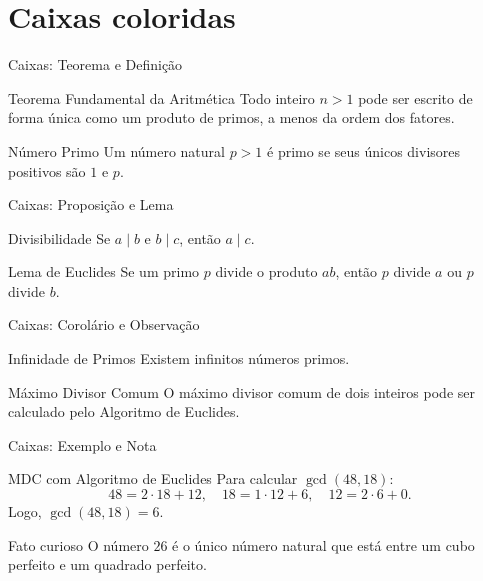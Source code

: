 \section{Caixas coloridas}

\begin{frame}{Caixas: Teorema e Definição}
	\begin{CaixaTeo}{Teorema Fundamental da Aritmética}
		Todo inteiro $n > 1$ pode ser escrito de forma única como um produto de primos, a menos da ordem dos fatores.
	\end{CaixaTeo}
	
	\begin{CaixaDef}{Número Primo}
		Um número natural $p > 1$ é primo se seus únicos divisores positivos são $1$ e $p$.
	\end{CaixaDef}
\end{frame}

\begin{frame}{Caixas: Proposição e Lema}
	\begin{CaixaProp}{Divisibilidade}
		Se $a \mid b$ e $b \mid c$, então $a \mid c$.
	\end{CaixaProp}
	
	\begin{CaixaLema}{Lema de Euclides}
		Se um primo $p$ divide o produto $ab$, então $p$ divide $a$ ou $p$ divide $b$.
	\end{CaixaLema}
\end{frame}

\begin{frame}{Caixas: Corolário e Observação}
	\begin{CaixaCoro}{Infinidade de Primos}
		Existem infinitos números primos.
	\end{CaixaCoro}
	
	\begin{CaixaObs}{Máximo Divisor Comum}
		O máximo divisor comum de dois inteiros pode ser calculado pelo Algoritmo de Euclides.
	\end{CaixaObs}
\end{frame}

\begin{frame}{Caixas: Exemplo e Nota}
	\begin{CaixaExem}{MDC com Algoritmo de Euclides}
		Para calcular $\gcd(48,18)$:
		\begin{equation*}
			48 = 2 \cdot 18 + 12,\quad 18 = 1 \cdot 12 + 6,\quad 12 = 2 \cdot 6 + 0.
		\end{equation*}
		Logo, $\gcd(48,18) = 6$.
	\end{CaixaExem}
	
	\begin{CaixaObs}{Fato curioso}
		O número $26$ é o único número natural que está entre um cubo perfeito e um quadrado perfeito.
	\end{CaixaObs}
	
\end{frame}
